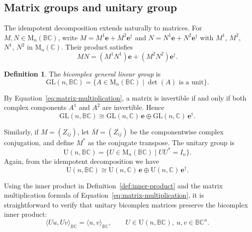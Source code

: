 \documentclass[11pt]{amsart}
\newcommand{\BC}{\mathbb{BC}}       %
\newcommand{\C}{\mathbb{C}}          %
\newcommand{\e}{\mathbf{e}}          %
\newcommand{\ed}{\mathbf{e}^\dagger} %
\theoremstyle{definition}
\newtheorem{defn}[prop]{Definition}       %
\begin{document}
\subsection{Matrix groups and unitary group}

The idempotent decomposition extends naturally to matrices. For $M, N \in \mathrm{M}_n(\BC)$, write $M = M^1\e + M^2\ed$ and $N = N^1\e + N^2\ed$ with $M^1$, $M^2$, $N^1$, $N^2$ in $\mathrm{M}_n(\C)$. Their product satisfies
\begin{equation}\label{eq:matrix-multiplication}
    MN = (M^1 N^1)\e + (M^2 N^2)\ed.
\end{equation}

\begin{defn}
    The \emph{bicomplex general linear group} is
    \begin{equation*}
        \mathrm{GL}(n,\BC)
        = \{ A \in \mathrm{M}_n(\BC) \mid \det(A) \text{ is a unit} \}.
    \end{equation*}
\end{defn}

By Equation~\eqref{eq:matrix-multiplication}, a matrix is invertible if and only if both complex components $A^1$ and $A^2$ are invertible. Hence
\begin{equation*}
    \mathrm{GL}(n,\BC) \cong \mathrm{GL}(n,\C)\,\e \oplus \mathrm{GL}(n,\C)\,\ed.
\end{equation*}

Similarly, if $M = (Z_{ij})$, let $\overline{M} = (\overline{Z_{ij}})$ be the componentwise complex conjugation, and define $M^*$ as the conjugate transpose. The unitary group is
\begin{equation*}
    \mathrm{U}(n,\BC) = \{ U \in \mathrm{M}_n(\BC) \mid U U^* = I_n \}.
\end{equation*}
Again, from the idempotent decomposition we have
\begin{equation}
    \mathrm{U}(n,\BC) \cong \mathrm{U}(n,\C)\,\e \oplus \mathrm{U}(n,\C)\,\ed.
\end{equation}

Using the inner product in Definition~\ref{def:inner-product} and the matrix multiplication formula of Equation~\eqref{eq:matrix-multiplication}, it is straightforward to verify that unitary bicomplex matrices preserve the bicomplex inner product:
\begin{equation*}
    \langle U u, U v \rangle_{\BC} = \langle u, v \rangle_{\BC}, \qquad U \in \mathrm{U}(n,\BC),\ u,v \in \BC^n.
\end{equation*}
\end{document}
